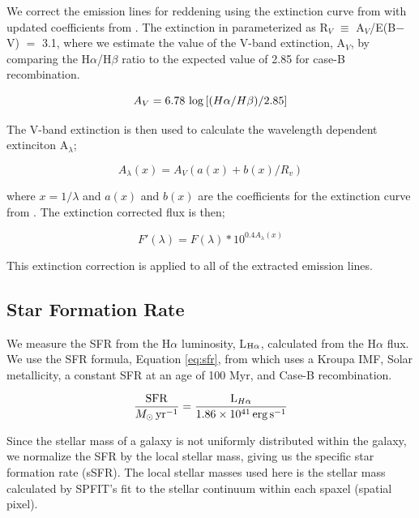 \documentclass[iop,revtex4,twocolumn,apj,numberedappendix,appendixfloats]{emulateapj}
\begin{document}
We correct the emission lines for reddening using the extinction curve from \citet{Cardelli:1989} with updated coefficients from \citet{ODonnell:1994}. The extinction in parameterized as R$_V$ $\equiv$ A$_V$/E(B$-$V) $=$ 3.1, where we estimate the value of the V-band extinction, A$_V$, by comparing the H$\alpha$/H$\beta$ ratio to the expected value of 2.85 for case-B recombination. 

\begin{equation}
A_V = 6.78\ {\rm log} \left[(H\alpha/H\beta)/2.85 \right]
\end{equation}

The V-band extinction is then used to calculate the wavelength dependent extinciton A$_{\lambda}$;

\begin{equation}
A_{\lambda}(x) = A_V \left(a(x) + b(x) / R_v \right)
\end{equation}

where $x = 1/\lambda$ and $a(x)$ and $b(x)$ are the coefficients for the extinction curve from \citet{ODonnell:1994}. The extinction corrected flux is then;

\begin{equation}
F'(\lambda) = F(\lambda) * 10^{0.4 A_{\lambda}(x)}
\end{equation}

This extinction correction is applied to all of the extracted emission lines.

\subsection{Star Formation Rate}

We measure the SFR from the H$\alpha$ luminosity, L$_{{\rm H}\alpha}$, calculated from the H$\alpha$ flux.  We use the SFR formula, Equation \ref{eq:sfr}, from \citet{Murphy:2011} which uses a Kroupa IMF, Solar metallicity, a constant SFR at an age of 100 Myr, and Case-B recombination. 

\begin{equation}\label{eq:sfr}
\frac{\rm{SFR}}{M_{\odot} \, \rm{yr^{-1}}} = \frac{{\rm L}_{H\alpha}}{1.86 \times 10^{41}\, \rm{erg\,s}^{-1}}
\end{equation}

Since the stellar mass of a galaxy is not uniformly distributed within the galaxy, we normalize the SFR by the local stellar mass, giving us the specific star formation rate (sSFR). The local stellar masses used here is the stellar mass calculated by {\sc SPFIT}'s fit to the stellar continuum within each spaxel (spatial pixel).
\end{document}
